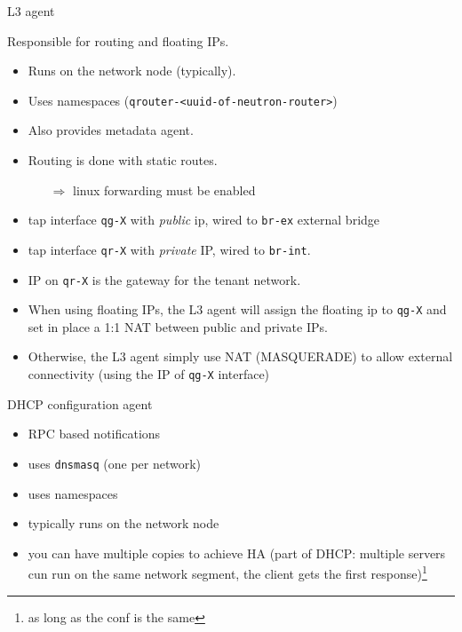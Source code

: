 \documentclass[english,serif,mathserif,xcolor=pdftex,dvipsnames,table]{beamer}
\begin{document}
\begin{frame}
  {L3 agent}

  Responsible for routing and floating IPs.

\scriptsize  \begin{itemize}
  \item Runs on the network node (typically).

  \item Uses namespaces (\texttt{qrouter-<uuid-of-neutron-router>})

  \item Also provides metadata agent.

  \item Routing is done with static routes.
    \begin{itemize}\scriptsize
    \item[$\Rightarrow$] linux forwarding must be enabled
    \end{itemize}
  \item tap interface \texttt{qg-X} with \textit{public} ip, wired to
    \texttt{br-ex} external bridge

  \item tap interface \texttt{qr-X} with \textit{private} IP, wired to
    \texttt{br-int}.

  \item IP on \texttt{qr-X} is the gateway for the tenant network.

  \item When using floating IPs, the L3 agent will assign the floating
    ip to \texttt{qg-X} and set in place a 1:1 NAT between public and
    private IPs.

  \item Otherwise, the L3 agent simply use NAT (MASQUERADE) to allow
    external connectivity (using the IP of \texttt{qg-X} interface)
  \end{itemize}
\end{frame}

\begin{frame}
  {DHCP configuration agent}
  \begin{itemize}
  \item RPC based notifications
  \item uses \texttt{dnsmasq} (one per network)
  \item uses namespaces
  \item typically runs on the network node
  \item you can have multiple copies to achieve HA (part of DHCP:
    multiple servers cun run on the same network segment, the client
    gets the first response)\footnote{as long as the conf is the same}
  \end{itemize}
\end{frame}
\end{document}
